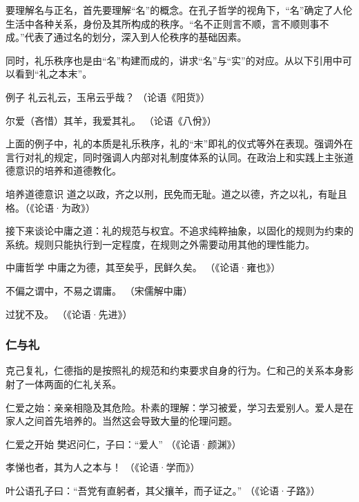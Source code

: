 \documentclass{ctexart}
\begin{document}
要理解名与正名，首先要理解“名”的概念。在孔子哲学的视角下，“名”确定了人伦生活中各种关系，身份及其所构成的秩序。“名不正则言不顺，言不顺则事不成。”代表了通过名的划分，深入到人伦秩序的基础因素。

同时，礼乐秩序也是由“名”构建而成的，讲求“名”与“实”的对应。从以下引用中可以看到“礼之本末”。

\begin{fancybox}{例子}
    礼云礼云，玉帛云乎哉？  （论语《阳货》）

    尔爱（吝惜）其羊，我爱其礼。  （论语《八佾》）
\end{fancybox}

上面的例子中，礼的本质是礼乐秩序，礼的“末”即礼的仪式等外在表现。强调外在言行对礼的规定，同时强调人内部对礼制度体系的认同。在政治上和实践上主张道德意识的培养和道德教化。

\begin{fancybox}{培养道德意识}
    道之以政，齐之以刑，民免而无耻。道之以德，齐之以礼，有耻且格。（《论语·为政》）
\end{fancybox}

接下来谈论中庸之道：礼的规范与权宜。不追求纯粹抽象，以固化的规则为约束的系统。规则只能执行到一定程度，在规则之外需要动用其他的理性能力。

\begin{fancybox}{中庸哲学}
    中庸之为德，其至矣乎，民鲜久矣。   （《论语·雍也》）

    不偏之谓中，不易之谓庸。    （宋儒解中庸）

    过犹不及。     （《论语·先进》）
\end{fancybox}

\subsubsection{仁与礼}

克己复礼，仁德指的是按照礼的规范和约束要求自身的行为。仁和己的关系本身影射了一体两面的仁礼关系。

仁爱之始：亲亲相隐及其危险。朴素的理解：学习被爱，学习去爱别人。爱人是在家人之间首先培养的。当然这会导致大量的伦理问题。

\begin{fancybox}{仁爱之开始}
    樊迟问仁，子曰：“爱人”     （《论语·颜渊》）

    孝悌也者，其为人之本与！      （《论语·学而》）

    叶公语孔子曰：“吾党有直躬者，其父攘羊，而子证之。”       （《论语·子路》）
\end{fancybox}
\end{document}
